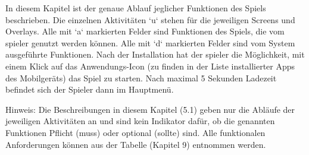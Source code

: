 In diesem Kapitel ist der genaue Ablauf jeglicher Funktionen des Spiels beschrieben. Die einzelnen Aktivitäten ‘u‘ stehen für die jeweiligen Screens und Overlays. 
Alle mit ‘a‘ markierten Felder sind Funktionen des Spiels, die vom \gls{spieler} genutzt werden können. Alle mit ‘d‘ markierten Felder sind vom System ausgeführte Funktionen. 
Nach der Installation hat der \gls{spieler} die Möglichkeit, mit einem Klick auf das Anwendungs-Icon (zu finden in der Liste installierter Apps des Mobilgeräts) das Spiel zu starten. 
Nach maximal 5 Sekunden Ladezeit befindet sich der Spieler dann im Hauptmenü. 

Hinweis: Die Beschreibungen in diesem Kapitel (5.1) geben nur die Abläufe der jeweiligen Aktivitäten an und sind kein Indikator dafür, 
ob die genannten Funktionen Pflicht (\gls{muss}) oder optional (\gls{sollte}) sind. Alle funktionalen Anforderungen können aus der Tabelle (Kapitel 9) entnommen werden.  

